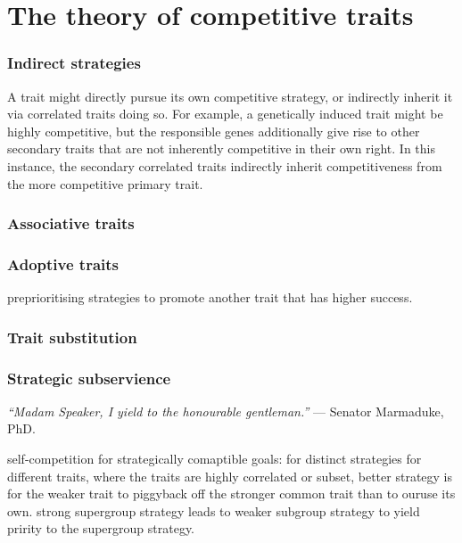 \documentclass[twocolumn, aps, rmp, amsmath, amssymb, nofootinbib, superscriptaddress, longbibliography, floatfix, table-of-contents, eqsecnum]{revtex4-1}
\newcommand{\famousquote}[2]{{\textit{``#1''} --- #2.}\newline}
\begin{document}
%
%

\part{The theory of competitive traits}

\section{Indirect strategies}

A trait might directly pursue its own competitive strategy, or indirectly inherit it via correlated traits doing so. For example, a genetically induced trait might be highly competitive, but the responsible genes additionally give rise to other secondary traits that are not inherently competitive in their own right. In this instance, the secondary correlated traits indirectly inherit competitiveness from the more competitive primary trait.

\section{Associative traits}

\section{Adoptive traits}

preprioritising strategies to promote another trait that has higher success.

\section{Trait substitution}

\section{Strategic subservience}

\famousquote{Madam Speaker, I yield to the honourable gentleman.}{Senator Marmaduke, PhD}

self-competition for strategically comaptible goals:
for distinct strategies for different traits, where the traits are highly correlated or subset, better strategy is for the weaker trait to piggyback off the stronger common trait than to ouruse its own. strong supergroup strategy leads to weaker subgroup strategy to yield pririty to the supergroup strategy.
\end{document}
